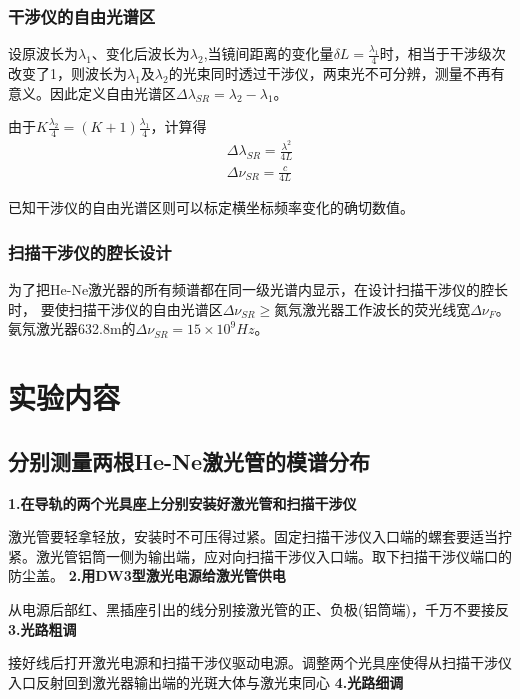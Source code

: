 \documentclass[UTF8]{ctexart}
\begin{document}
\begin{multicols}{2}
\subsubsection{干涉仪的自由光谱区}
设原波长为$\lambda_1$、变化后波长为$\lambda_2$,当镜间距离的变化量$\delta L=\frac{\lambda_{1}}{4}$时，相当于干涉级次改变了1，则波长为$\lambda_1$及$\lambda_2$的光束同时透过干涉仪，两束光不可分辨，测量不再有意义。因此定义自由光谱区$\Delta\lambda_{SR}=\lambda_2-\lambda_1$。

由于$K \frac{\lambda_{2}}{4}=(K+1) \frac{\lambda_{1}}{4}$，计算得
\begin{equation}
\begin{array}{l}{\Delta \lambda_{S R}=\frac{\lambda^{2}}{4 L}} \\ {\Delta\nu_{S R}=\frac{c}{4 L}}\end{array}
\end{equation}

已知干涉仪的自由光谱区则可以标定横坐标频率变化的确切数值。

\subsubsection{扫描干涉仪的腔长设计}
为了把He-Ne激光器的所有频谱都在同一级光谱内显示，在设计扫描干涉仪的腔长时，
要使扫描干涉仪的自由光谱区$\Delta\nu_{S R}\geq$氮氖激光器工作波长的荧光线宽$\Delta\nu_{F}$。氨氖激光器632.8m的$\Delta\nu_{S R}=15\times10^9Hz$。

\section{实验内容}
\subsection{分别测量两根He-Ne激光管的模谱分布}
\noindent\textbf{1.在导轨的两个光具座上分别安装好激光管和扫描干涉仪}

激光管要轻拿轻放，安装时不可压得过紧。固定扫描干涉仪入口端的螺套要适当拧紧。激光管铝筒一侧为输出端，应对向扫描干涉仪入口端。取下扫描干涉仪端口的防尘盖。
\newline\textbf{2.用DW3型激光电源给激光管供电}

从电源后部红、黑插座引出的线分别接激光管的正、负极(铝筒端)，千万不要接反
\newline\textbf{3.光路粗调}

接好线后打开激光电源和扫描干涉仪驱动电源。调整两个光具座使得从扫描干涉仪入口反射回到激光器输出端的光斑大体与激光束同心
\newline\textbf{4.光路细调}


\end{multicols}
\end{document}
